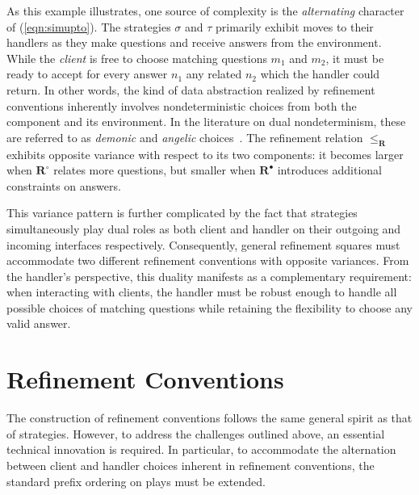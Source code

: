 As this example illustrates,
one source of complexity is
the \emph{alternating} character of (\ref{eqn:simupto}).
The strategies $\sigma$ and $\tau$
primarily exhibit moves to their handlers
as they make questions and receive answers from the environment.
While the \emph{client} is free to choose
matching questions $m_1$ and $m_2$,
it must be ready to accept for every answer $n_1$
any related $n_2$ which the handler could return.
In other words,
the kind of data abstraction realized by refinement conventions
inherently involves nondeterministic choices
from both the component and its environment.
In the literature on dual nondeterminism,
these are referred to as \emph{demonic} and \emph{angelic} choices~\citep{dndf}.
The refinement relation
$\le_\mathbf{R}$
exhibits opposite variance with respect to its two components:
it becomes larger
when $\mathbf{R}^\circ$ relates more questions,
but smaller when $\mathbf{R}^\bullet$
introduces additional constraints on answers.

This variance pattern is further complicated by the fact that
strategies simultaneously play
dual roles as both client and handler
on their outgoing and incoming interfaces respectively.
Consequently,
general refinement squares
must accommodate two different refinement conventions
with opposite variances.
From the handler's perspective,
this duality manifests as a complementary requirement:
when interacting with clients,
the handler must be robust enough
to handle all possible choices of matching questions
while retaining the flexibility to choose any valid answer.

\section{Refinement Conventions}
\label{sec:rc:refconv}

The construction of refinement conventions
follows the same general spirit as that of strategies.
However,
to address the challenges outlined above,
an essential technical innovation is required.
In particular,
to accommodate
the alternation between client and handler choices
inherent in refinement conventions,
the standard prefix ordering on plays must be extended.

